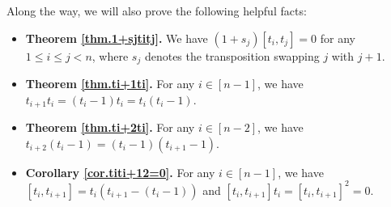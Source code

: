 \documentclass[numbers=enddot,12pt,final,onecolumn,notitlepage]{scrartcl}%
\theoremstyle{definition}
\begin{document}
Along the way, we will also prove the following helpful facts:

\begin{itemize}
\item \textbf{Theorem \ref{thm.1+sjtitj}.} We have $\left(  1+s_{j}\right)
\left[  t_{i},t_{j}\right]  =0$ for any $1\leq i\leq j<n$, where $s_{j}$
denotes the transposition swapping $j$ with $j+1$.

\item \textbf{Theorem \ref{thm.ti+1ti}.} For any $i\in\left[  n-1\right]  $,
we have $t_{i+1}t_{i}=\left(  t_{i}-1\right)  t_{i}=t_{i}\left(
t_{i}-1\right)  $.

\item \textbf{Theorem \ref{thm.ti+2ti}.} For any $i\in\left[  n-2\right]  $,
we have $t_{i+2}\left(  t_{i}-1\right)  =\left(  t_{i}-1\right)  \left(
t_{i+1}-1\right)  $.

\item \textbf{Corollary \ref{cor.titi+12=0}.} For any $i\in\left[  n-1\right]
$, we have $\left[  t_{i},t_{i+1}\right]  =t_{i}\left(  t_{i+1}-\left(
t_{i}-1\right)  \right)  $ and $\left[  t_{i},t_{i+1}\right]  t_{i}=\left[
t_{i},t_{i+1}\right]  ^{2}=0$.
\end{itemize}
\end{document}
